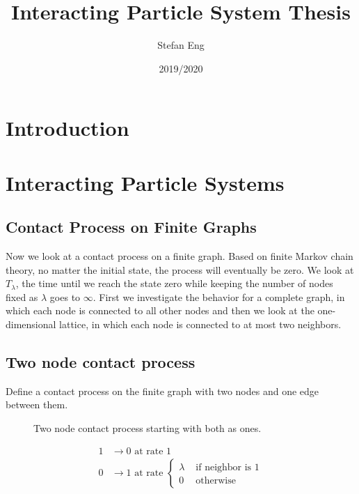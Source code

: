 \documentclass{article}
\title{Interacting Particle System Thesis}
\author{Stefan Eng}
\date{2019/2020}
\theoremstyle{plain}
\theoremstyle{definition}
\theoremstyle{remark}
\begin{document}
\maketitle

\section{Introduction}

\section{Interacting Particle Systems}

\subsection{Contact Process on Finite Graphs}

Now we look at a contact process on a finite graph.
Based on finite Markov chain theory, no matter the initial state, the process will eventually be zero.
We look at $T_\lambda$, the time until we reach the state zero while keeping the number of nodes fixed as $\lambda$ goes to $\infty$.
First we investigate the behavior for a complete graph, in which each node is connected to all other nodes and then we look at the one-dimensional lattice, in which each node is connected to at most two neighbors.

\subsection{Two node contact process}

Define a contact process on the finite graph with two nodes and one edge between them.

\begin{figure}
    \centering
    \caption{Two node contact process starting with both as ones.}
    \label{fig:two_node_contact}
\end{figure}

\begin{align}
    1 &\to 0 \text{ at rate } 1\\
    0 &\to 1 \text{ at rate } \begin{cases}
        \lambda & \text{ if neighbor is 1}\\
        0 & \text{ otherwise}
    \end{cases}
\end{align}
\end{document}
